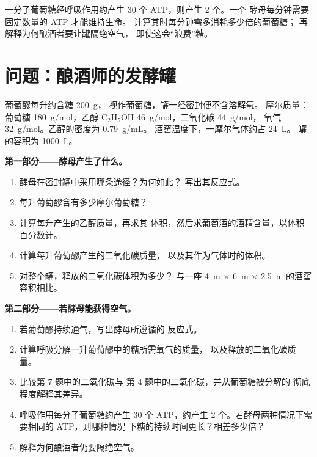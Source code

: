 \begin{exercise}[$\star\star\star$]\label{exo:g10:cell-metabolism:15}
一分子葡萄糖经呼吸作用约产生 30 个 ATP，则产生 2 个。一个
酵母每分钟需要固定数量的 ATP 才能维持生命。
计算其时每分钟需多消耗多少倍的葡萄糖；
再解释为何酿酒者要让罐隔绝空气，
即使这会“浪费”糖。
\end{exercise}

\section{问题：酿酒师的发酵罐}

\begin{problem}
\label{pb:g10:cell-metabolism:1}
葡萄醪每升约含糖 \qty{200}{g}，
视作葡萄糖，罐一经密封便不含溶解氧。
摩尔质量：葡萄糖 \qty{180}{g/mol}，乙醇
$\mathrm{C_2H_5OH}$ \qty{46}{g/mol}，二氧化碳 \qty{44}{g/mol}，
氧气 \qty{32}{g/mol}。乙醇的密度为 \qty{0.79}{g/mL}。
酒窖温度下，一摩尔气体约占 \qty{24}{L}。
罐的容积为 \qty{1000}{L}。

\medskip
\noindent\textbf{第一部分——酵母产生了什么。}
\begin{enumerate}
  \item 酵母在密封罐中采用哪条途径？为何如此？
        写出其反应式。
  \item 每升葡萄醪含有多少摩尔葡萄糖？
  \item 计算每升产生的乙醇质量，再求其
        体积，然后求葡萄酒的酒精含量，以体积
        百分数计。
  \item 计算每升葡萄醪产生的二氧化碳质量，
        以及其作为气体时的体积。
  \item 对整个罐，释放的二氧化碳体积为多少？
        与一座 \qty{4}{m} × \qty{6}{m}
        × \qty{2.5}{m} 的酒窖容积相比。
\end{enumerate}

\medskip
\noindent\textbf{第二部分——若酵母能获得空气。}
\begin{enumerate}[resume]
  \item 若葡萄醪持续通气，写出酵母所遵循的
        反应式。
  \item 计算呼吸分解一升葡萄醪中的糖所需氧气的质量，
        以及释放的二氧化碳质量。
  \item 比较第 7 题中的二氧化碳与
        第 4 题中的二氧化碳，并从葡萄糖被分解的
        彻底程度解释其差异。
  \item 呼吸作用每分子葡萄糖约产生 30 个 ATP，约产生
        2 个。若酵母两种情况下需要相同的 ATP，则哪种情况
        下糖的持续时间更长？相差多少倍？
  \item 解释为何酿酒者仍要隔绝空气。
\end{enumerate}


\end{problem}
